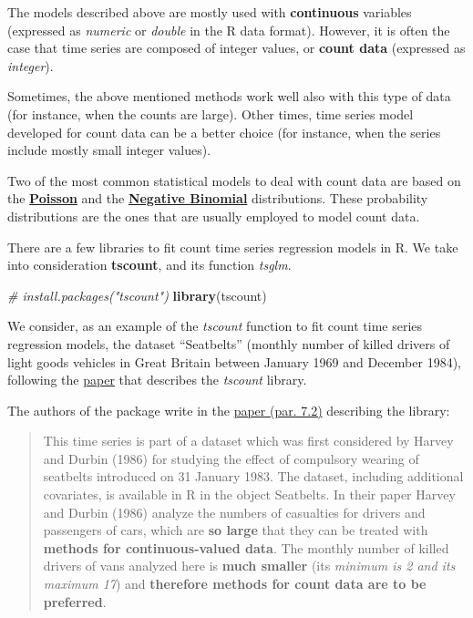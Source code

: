 \documentclass[
]{article}
\newenvironment{Shaded}{\begin{snugshade}}{\end{snugshade}}
\newcommand{\CommentTok}[1]{\textcolor[rgb]{0.56,0.35,0.01}{\textit{#1}}}
\newcommand{\FunctionTok}[1]{\textcolor[rgb]{0.13,0.29,0.53}{\textbf{#1}}}
\newcommand{\NormalTok}[1]{#1}
\begin{document}
The models described above are mostly used with \textbf{continuous} variables (expressed as \emph{numeric} or \emph{double} in the R data format). However, it is often the case that time series are composed of integer values, or \textbf{count data} (expressed as \emph{integer}).

Sometimes, the above mentioned methods work well also with this type of data (for instance, when the counts are large). Other times, time series model developed for count data can be a better choice (for instance, when the series include mostly small integer values).

Two of the most common statistical models to deal with count data are based on the \href{https://en.wikipedia.org/wiki/Poisson_distribution}{\textbf{Poisson}} and the \href{https://en.wikipedia.org/wiki/Negative_binomial_distribution}{\textbf{Negative Binomial}} distributions. These probability distributions are the ones that are usually employed to model count data.

There are a few libraries to fit count time series regression models in R. We take into consideration \textbf{tscount}, and its function \emph{tsglm}.

\begin{Shaded}
\begin{Highlighting}[]
\CommentTok{\# install.packages("tscount")}
\FunctionTok{library}\NormalTok{(tscount)}
\end{Highlighting}
\end{Shaded}

We consider, as an example of the \emph{tscount} function to fit count time series regression models, the dataset ``Seatbelts'' (monthly number of killed drivers of light goods vehicles in Great Britain between January 1969 and December 1984), following the \href{https://cran.r-project.org/web/packages/tscount/vignettes/tsglm.pdf}{paper} that describes the \emph{tscount} library.

The authors of the package write in the \href{https://cran.r-project.org/web/packages/tscount/vignettes/tsglm.pdf}{paper (par. 7.2)} describing the library:

\begin{quote}
This time series is part of a dataset which was first considered by Harvey and Durbin (1986) for studying the effect of compulsory wearing of seatbelts introduced on 31 January 1983. The dataset, including additional covariates, is available in R in the object Seatbelts. In their paper Harvey and Durbin (1986) analyze the numbers of casualties for drivers and passengers of cars, which are \textbf{so large} that they can be treated with \textbf{methods for continuous-valued data}. The monthly number of killed drivers of vans analyzed here is \textbf{much smaller} (its \emph{minimum is 2 and its maximum 17}) and \textbf{therefore methods for count data are to be preferred}.
\end{quote}
\end{document}

